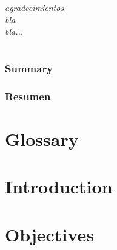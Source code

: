 \documentclass[a4paper,10pt,english]{report} %
\begin{document}
\pagestyle{empty}


\cleardoublepage

\cleardoublepage

\cleardoublepage


\chapter*{}
\thispagestyle{empty}

\begingroup
\begin{flushleft}
\itshape
agradecimientos\\
bla\\
bla...
\end{flushleft}
\endgroup

\cleardoublepage

\chapter*{}
\subsection*{Summary}

\subsection*{Resumen}


\pagestyle{plain}

\tableofcontents
\listoffigures
\listoftables
\cleardoublepage

\pagestyle{empty}
\chapter*{Glossary}

\cleardoublepage

\pagestyle{headings}



\chapter{Introduction}

\chapter{Objectives}

\end{document}
